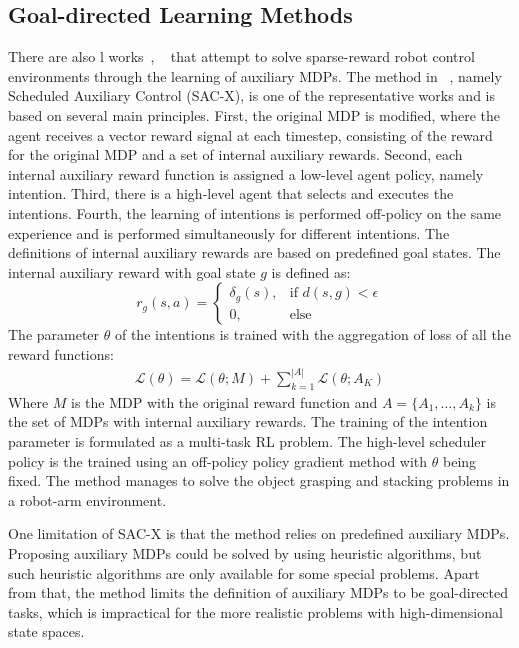 \subsection{Goal-directed Learning Methods}
There are also l works~\cite{riedmiller2018learning}, ~\cite{andrychowicz2017hindsight} that attempt to solve sparse-reward robot control environments through the learning of auxiliary MDPs.
The method in ~\cite{riedmiller2018learning}, namely Scheduled Auxiliary Control (SAC-X), is one of the representative works and is based on several main principles. First, the original MDP is modified, where the agent receives a vector reward signal at each timestep, consisting of the reward for the original MDP and a set of internal auxiliary rewards. Second, each internal auxiliary reward function is assigned a low-level agent policy, namely intention. Third, there is a high-level agent that selects and executes the intentions. Fourth, the learning of intentions is performed off-policy on the same experience and is performed simultaneously for different intentions.
The definitions of internal auxiliary rewards are based on predefined goal states. The internal auxiliary reward with goal state $g$ is defined as:
\begin{equation}
r_g(s,a)=
\begin{cases}
\delta_g(s),& \text{if } d(s,g)< \epsilon\\
0,              & \text{else}
\end{cases}
\end{equation}
The parameter $\theta$ of the intentions is trained with the aggregation of loss of all the reward functions:
\begin{align}
\mathcal{L}(\theta)  = \mathcal{L}(\theta;M) +\sum_{k=1}^{|A|} \mathcal{L}(\theta;A_K)
\end{align}
Where $M$ is the MDP with the original reward function and $A=\{A_1,\dots,A_k\}$ is the set of MDPs with internal auxiliary rewards. The training of the intention parameter is formulated as a multi-task RL problem.
The high-level scheduler policy is the trained using an off-policy policy gradient method with $\theta$ being fixed.
The method manages to solve the object grasping and stacking problems in a robot-arm environment. 

One limitation of SAC-X is that the method relies on predefined auxiliary MDPs. Proposing auxiliary MDPs could be solved by using heuristic algorithms, but such heuristic algorithms are only available for some special problems. Apart from that, the method limits the definition of auxiliary MDPs to be goal-directed tasks, which is impractical for the more realistic problems with high-dimensional state spaces.


